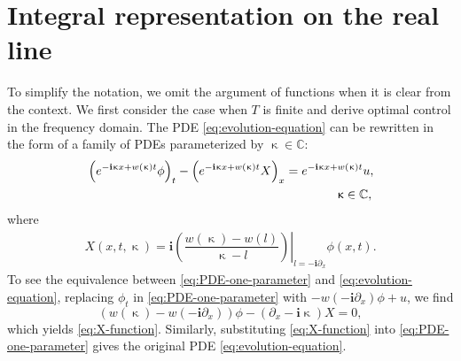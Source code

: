 \documentclass[journal,twoside,web]{ieeecolor}
\newcommand{\CC}{\mathbb{C}}
\newcommand{\state}{\phi}
\newcommand{\im}{\mathbf{i}}
\newcommand{\kcomplex}{\upkappa}
\begin{document}
\section{Integral representation on the real line}\label{sec:integral-representation-real}

To simplify the notation, we omit the argument of functions when it is clear from the context.
We first consider the case when $T$ is finite and derive optimal control in the frequency domain.
The PDE \eqref{eq:evolution-equation} can be rewritten in the form of a family of PDEs parameterized by $\kcomplex\in\CC$:
\begin{equation}\label{eq:PDE-one-parameter}
	\begin{aligned}
		&\left( e^{-\im \kcomplex x + w(\kcomplex)t} \state \right)_t - \left(e^{-\im \kcomplex x + w(\kcomplex)t} X \right)_x = e^{-\im \kcomplex x + w(\kcomplex)t} u, \\ &\hspace{2.8in} \kcomplex\in\CC,
	\end{aligned}
\end{equation}
where 
\begin{equation}\label{eq:X-function}
	\begin{aligned}
		X(x,t,\kcomplex) =\im\left.\left(\dfrac{w(\kcomplex)-w(l)}{\kcomplex-l}\right)\right|_{l=-\im\partial_x}  \state(x,t).
	\end{aligned}
\end{equation}
To see the equivalence between \eqref{eq:PDE-one-parameter} and \eqref{eq:evolution-equation}, replacing $\state_t$ in \eqref{eq:PDE-one-parameter} with $-w(-\im\partial_x)\state + u$, we find 
$$
(w(\kcomplex) - w(-\im\partial_x))\state - (\partial_x - \im \kcomplex)X=0, 
$$
which yields \eqref{eq:X-function}.
Similarly, substituting \eqref{eq:X-function} into \eqref{eq:PDE-one-parameter} gives the original PDE \eqref{eq:evolution-equation}. 
\end{document}
